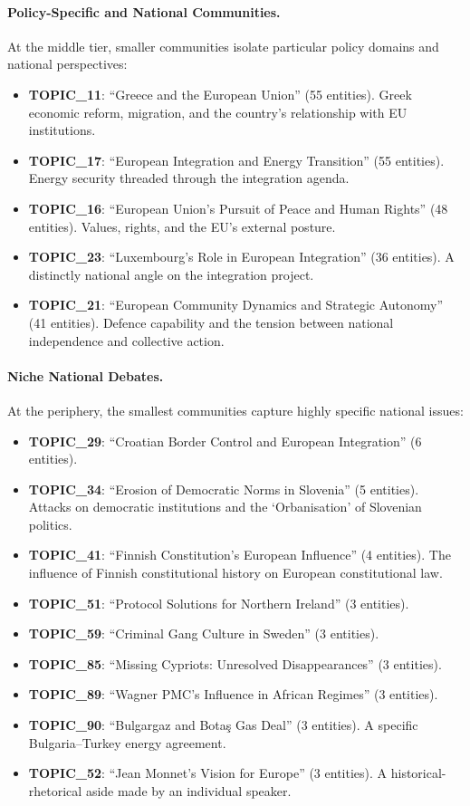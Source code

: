 \documentclass[11pt]{article}
\begin{document}
\paragraph{Policy-Specific and National Communities.}
At the middle tier, smaller communities isolate particular policy domains and national perspectives:

\begin{itemize}
  \item \textbf{TOPIC\_11}: ``Greece and the European Union'' (55 entities). Greek economic reform, migration, and the country's relationship with EU institutions.
  \item \textbf{TOPIC\_17}: ``European Integration and Energy Transition'' (55 entities). Energy security threaded through the integration agenda.
  \item \textbf{TOPIC\_16}: ``European Union's Pursuit of Peace and Human Rights'' (48 entities). Values, rights, and the EU's external posture.
  \item \textbf{TOPIC\_23}: ``Luxembourg's Role in European Integration'' (36 entities). A distinctly national angle on the integration project.
  \item \textbf{TOPIC\_21}: ``European Community Dynamics and Strategic Autonomy'' (41 entities). Defence capability and the tension between national independence and collective action.
\end{itemize}

\paragraph{Niche National Debates.}
At the periphery, the smallest communities capture highly specific national issues:

\begin{itemize}
  \item \textbf{TOPIC\_29}: ``Croatian Border Control and European Integration'' (6 entities).
  \item \textbf{TOPIC\_34}: ``Erosion of Democratic Norms in Slovenia'' (5 entities). Attacks on democratic institutions and the `Orbanisation' of Slovenian politics.
  \item \textbf{TOPIC\_41}: ``Finnish Constitution's European Influence'' (4 entities). The influence of Finnish constitutional history on European constitutional law.
  \item \textbf{TOPIC\_51}: ``Protocol Solutions for Northern Ireland'' (3 entities).
  \item \textbf{TOPIC\_59}: ``Criminal Gang Culture in Sweden'' (3 entities).
  \item \textbf{TOPIC\_85}: ``Missing Cypriots: Unresolved Disappearances'' (3 entities).
  \item \textbf{TOPIC\_89}: ``Wagner PMC's Influence in African Regimes'' (3 entities).
  \item \textbf{TOPIC\_90}: ``Bulgargaz and Bota\c{s} Gas Deal'' (3 entities). A specific Bulgaria--Turkey energy agreement.
  \item \textbf{TOPIC\_52}: ``Jean Monnet's Vision for Europe'' (3 entities). A historical-rhetorical aside made by an individual speaker.
\end{itemize}
\end{document}
